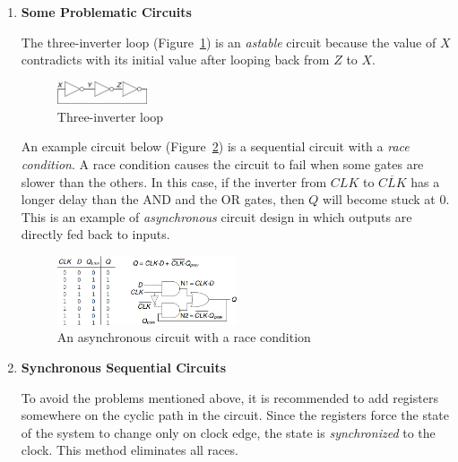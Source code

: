 \documentclass[12pt]{article}
\begin{document}
\begin{enumerate}
    \item \textbf{Some Problematic Circuits}

    The three-inverter loop (Figure~\ref{figure:10}) is an \textit{astable} circuit because the value of $X$ contradicts with its initial value after looping back from $Z$ to $X$.

    \begin{figure}[h]
        \centering
        \includegraphics[width=0.25\textwidth]{three_inverter_loop.png}
        \caption{Three-inverter loop}
        \label{figure:10}
    \end{figure}

    An example circuit below (Figure~\ref{figure:11}) is a sequential circuit with a \textit{race condition}. A race condition causes the circuit to fail when some gates are slower than the others. In this case, if the inverter from $CLK$ to $\overline{CLK}$ has a longer delay than the AND and the OR gates, then $Q$ will become stuck at 0. This is an example of \textit{asynchronous} circuit design in which outputs are directly fed back to inputs.

    \begin{figure}[h]
        \centering
        \includegraphics[width=0.5\textwidth]{race_condition_example.png}
        \caption{An asynchronous circuit with a race condition}
        \label{figure:11}
    \end{figure}

    \item \textbf{Synchronous Sequential Circuits}

    To avoid the problems mentioned above, it is recommended to add registers somewhere on the cyclic path in the circuit. Since the registers force the state of the system to change only on clock edge, the state is \textit{synchronized} to the clock. This method eliminates all races.


\end{enumerate}
\end{document}
